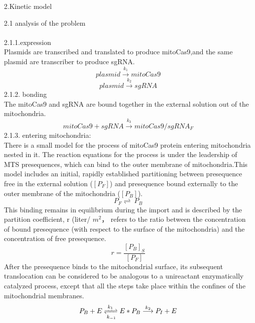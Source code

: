 \documentclass[a4paper,10pt]{article}
\begin{document}
	\begin{center}
	{\Large 2.Kinetic model} 
    \end{center}
  {\Large 2.1 analysis of the problem} 
\\\\
2.1.1.expression \\
Plasmids are transcribed and translated to produce mitoCas9,and the same plasmid are transcriber to produce sgRNA.
	\begin{displaymath}
	plasmid \stackrel{k_1}{\longrightarrow} mitoCas9 
	\end{displaymath}
	\begin{displaymath}
	plasmid\stackrel{k_2}{\longrightarrow}sgRNA
	\end{displaymath}
	2.1.2. bonding \\
	The mitoCas9 and sgRNA are bound together in the external solution out of the mitochondria.
	\begin{displaymath}
	mitoCas9+sgRNA\stackrel{k_3}{\longrightarrow}mitoCas9/sgRNA_F
	\end{displaymath}
	2.1.3. entering mitochondria:\\
There is a small model for the process of mitoCas9 protein entering mitochondria nested in it.
The reaction equations for the process is under the leadership of MTS presequences, which can bind to the outer membrane of mitochondria.This
model includes an initial, rapidly established partitioning between presequence free in the external solution ($[P_F]$) and presequence bound externally to the outer membrane of the mitochondria ($[P_B]$). 
\begin{displaymath}
P_F\rightleftharpoons\ P_B
\end{displaymath}
 This binding remains in equilibrium dur­ing the import and is described by  the partition  coefficient,  r (liter/ 
$m^2$， refers  to the  ratio
between the concentration of bound presequence (with re­spect to the surface of the mitochondria) and the concentra­tion of free presequence.
\begin{displaymath}
r=\frac{[P_B]_S}{[P_F]}
\end{displaymath}
After the presequence binds to the mitochondrial surface, its
subsequent translocation can be considered to be analogous to a unireactant enzymatically catalyzed process, except that all the steps take place within the confines of the mitochon­drial membranes.
\begin{displaymath}
P_B+E \xrightleftharpoons[k_{-1}]{k_1}  E * P_B \stackrel{k_2}{\longrightarrow} P_I+E
\end{displaymath}
\end{document}
